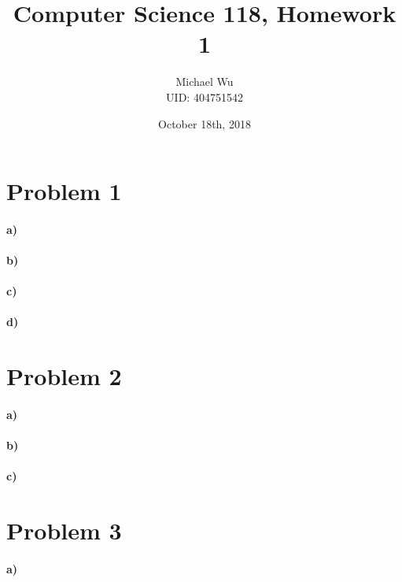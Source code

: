 \documentclass[12pt]{article}
\begin{document}
\title{Computer Science 118, Homework 1}
\date{October 18th, 2018}
\author{Michael Wu\\UID: 404751542}
\maketitle

\section*{Problem 1}

\paragraph{a)}

\paragraph{b)}

\paragraph{c)}

\paragraph{d)}

\section*{Problem 2}

\paragraph{a)}

\paragraph{b)}

\paragraph{c)}

\section*{Problem 3}

\paragraph{a)}
\end{document}
